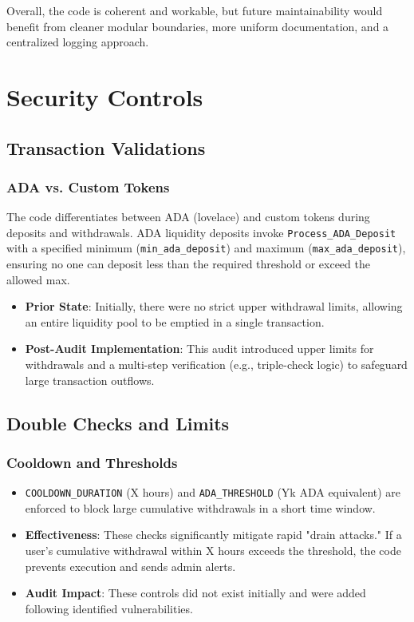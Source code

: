 \documentclass[11pt,a4paper]{article}
\begin{document}
Overall, the code is coherent and workable, but future maintainability would benefit from cleaner modular boundaries, more uniform documentation, and a centralized logging approach.

\section{Security Controls}

\subsection{Transaction Validations}

\subsubsection{ADA vs. Custom Tokens}
The code differentiates between ADA (lovelace) and custom tokens during deposits and withdrawals. ADA liquidity deposits invoke \texttt{Process\_ADA\_Deposit} with a specified minimum (\texttt{min\_ada\_deposit}) and maximum (\texttt{max\_ada\_deposit}), ensuring no one can deposit less than the required threshold or exceed the allowed max.

\begin{itemize}
    \item \textbf{Prior State}: Initially, there were no strict upper withdrawal limits, allowing an entire liquidity pool to be emptied in a single transaction.
    \item \textbf{Post-Audit Implementation}: This audit introduced upper limits for withdrawals and a multi-step verification (e.g., triple-check logic) to safeguard large transaction outflows.
\end{itemize}

\subsection{Double Checks and Limits}

\subsubsection{Cooldown and Thresholds}
\begin{itemize}
    \item \texttt{COOLDOWN\_DURATION} (X hours) and \texttt{ADA\_THRESHOLD} (Yk ADA equivalent) are enforced to block large cumulative withdrawals in a short time window.
    \item \textbf{Effectiveness}: These checks significantly mitigate rapid "drain attacks." If a user's cumulative withdrawal within X hours exceeds the threshold, the code prevents execution and sends admin alerts.
    \item \textbf{Audit Impact}: These controls did not exist initially and were added following identified vulnerabilities.
\end{itemize}
\end{document}
